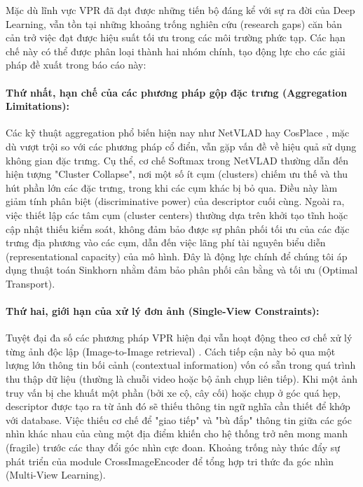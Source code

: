 \documentclass[12pt,a4paper]{article}
\begin{document}
    Mặc dù lĩnh vực VPR đã đạt được những tiến bộ đáng kể với sự ra đời của Deep Learning, vẫn tồn tại những khoảng trống nghiên cứu (research gaps) căn bản cản trở việc đạt được hiệu suất tối ưu trong các môi trường phức tạp. Các hạn chế này có thể được phân loại thành hai nhóm chính, tạo động lực cho các giải pháp đề xuất trong báo cáo này:

    \paragraph{Thứ nhất, hạn chế của các phương pháp gộp đặc trưng (Aggregation Limitations):}
    Các kỹ thuật aggregation phổ biến hiện nay như NetVLAD \cite{arandjelovic2016netvlad} hay CosPlace \cite{berton2022rethinking}, mặc dù vượt trội so với các phương pháp cổ điển, vẫn gặp vấn đề về hiệu quả sử dụng không gian đặc trưng. Cụ thể, cơ chế Softmax trong NetVLAD thường dẫn đến hiện tượng "Cluster Collapse", nơi một số ít cụm (clusters) chiếm ưu thế và thu hút phần lớn các đặc trưng, trong khi các cụm khác bị bỏ qua. Điều này làm giảm tính phân biệt (discriminative power) của descriptor cuối cùng. Ngoài ra, việc thiết lập các tâm cụm (cluster centers) thường dựa trên khởi tạo tĩnh hoặc cập nhật thiếu kiểm soát, không đảm bảo được sự phân phối tối ưu của các đặc trưng địa phương vào các cụm, dẫn đến việc lãng phí tài nguyên biểu diễn (representational capacity) của mô hình. Đây là động lực chính để chúng tôi áp dụng thuật toán Sinkhorn \cite{cuturi2013sinkhorn} nhằm đảm bảo phân phối cân bằng và tối ưu (Optimal Transport).

    \paragraph{Thứ hai, giới hạn của xử lý đơn ảnh (Single-View Constraints):}
    Tuyệt đại đa số các phương pháp VPR hiện đại vẫn hoạt động theo cơ chế xử lý từng ảnh độc lập (Image-to-Image retrieval) \cite{xu2025crisalad}. Cách tiếp cận này bỏ qua một lượng lớn thông tin bối cảnh (contextual information) vốn có sẵn trong quá trình thu thập dữ liệu (thường là chuỗi video hoặc bộ ảnh chụp liên tiếp). Khi một ảnh truy vấn bị che khuất một phần (bởi xe cộ, cây cối) hoặc chụp ở góc quá hẹp, descriptor được tạo ra từ ảnh đó sẽ thiếu thông tin ngữ nghĩa cần thiết để khớp với database. Việc thiếu cơ chế để "giao tiếp" và "bù đắp" thông tin giữa các góc nhìn khác nhau của cùng một địa điểm khiến cho hệ thống trở nên mong manh (fragile) trước các thay đổi góc nhìn cực đoan. Khoảng trống này thúc đẩy sự phát triển của module CrossImageEncoder để tổng hợp tri thức đa góc nhìn (Multi-View Learning).
\end{document}
